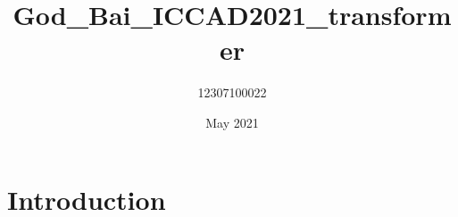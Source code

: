 \documentclass{article}
\title{God_Bai_ICCAD2021_transformer}
\author{12307100022 }
\date{May 2021}
\begin{document}
\maketitle

\section{Introduction}
\end{document}
